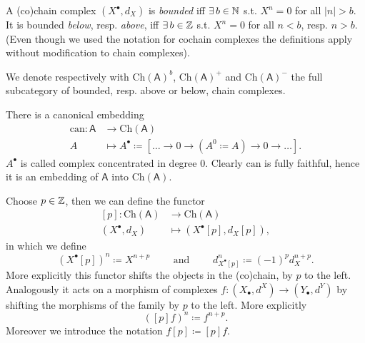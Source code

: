 \begin{defn}
	A (co)chain complex $\left(X^{\bullet}, d_X\right)$ is {\em bounded} iff
	$\exists\, b \in \mathbb{N}$ s.t. $X^n = 0$ for all $\left| n \right| > b$.
	It is bounded {\em below}, resp. {\em above}, iff
	$\exists\, b \in \mathbb{Z}$ s.t. $X^n = 0$ for all
	$n < b$, resp. $n > b$.
	(Even though we used the notation for cochain complexes the definitions apply without
	modification to chain complexes).

	We denote respectively with $\mathrm{Ch}(\mathsf{A})^b$, $\mathrm{Ch}(\mathsf{A})^+$
	and $\mathrm{Ch}(\mathsf{A})^-$ the full subcategory of bounded, resp. above or below, chain complexes.
\end{defn}

\begin{defn}
	There is a canonical embedding
	\begin{align}
		\mathrm{can}\colon \mathsf{A} &\to \mathrm{Ch}(\mathsf{A}) \\
		A &\mapsto A^{\bullet} \coloneqq \left[ 
		\ldots \to 0 \to (A^0 \coloneqq A) \to 0 \to \ldots \right]
	.\end{align} 
	$A^{\bullet}$ is called complex concentrated in degree $0$.
	Clearly $\mathrm{can}$ is fully faithful, hence it is an embedding of $\mathsf{A}$ into $\mathrm{Ch}(\mathsf{A})$.
\end{defn}

\begin{defn}
	Choose $p \in \mathbb{Z}$, then we can define the functor
	\begin{align}
		\left[ p \right]\colon \mathrm{Ch}(\mathsf{A}) &\to \mathrm{Ch}(\mathsf{A}) \\
		\left(X^{\bullet}, d_X\right) &\mapsto \left( X^{\bullet}[p], d_{X}[p] \right)
	,\end{align} 
	in which we define
	\begin{equation}
		\left( X^{\bullet} [p] \right)^n \coloneqq X^{n+p} \qquad \text{ and } \qquad
		d^n_{X^{\bullet}[p]} \coloneqq (-1)^{p} d_X^{n+p}
	.\end{equation} 
	More explicitly this functor shifts the objects in the (co)chain, by $p$ to the left.
	Analogously it acts on a morphism of complexes
	$f\colon \left( X_{\bullet}, d^{X} \right) \to \left( Y_{\bullet}, d^{Y} \right)$
	by shifting the morphisms of the family by $p$ to the left.
	More explicitly
	\begin{equation}
		\left( [p]f \right)^n \coloneqq f^{n+p}
	.\end{equation} 
	Moreover we introduce the notation $f[p] \coloneqq [p]f$.
\end{defn}

